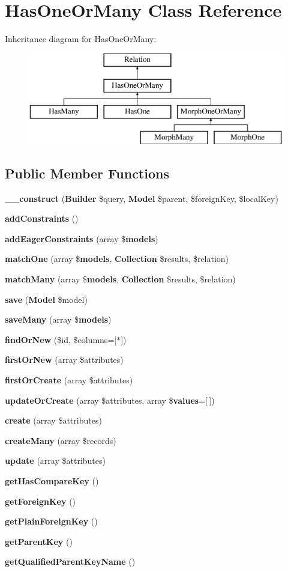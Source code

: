\section{Has\+One\+Or\+Many Class Reference}
\label{class_illuminate_1_1_database_1_1_eloquent_1_1_relations_1_1_has_one_or_many}
Inheritance diagram for Has\+One\+Or\+Many\+:\begin{figure}[H]
\begin{center}
\leavevmode
\includegraphics[height=4.000000cm]{class_illuminate_1_1_database_1_1_eloquent_1_1_relations_1_1_has_one_or_many}
\end{center}
\end{figure}
\subsection*{Public Member Functions}
\begin{DoxyCompactItemize}
\item 
{\bf \+\_\+\+\_\+construct} ({\bf Builder} \$query, {\bf Model} \$parent, \$foreign\+Key, \$local\+Key)
\item 
{\bf add\+Constraints} ()
\item 
{\bf add\+Eager\+Constraints} (array \${\bf models})
\item 
{\bf match\+One} (array \${\bf models}, {\bf Collection} \$results, \$relation)
\item 
{\bf match\+Many} (array \${\bf models}, {\bf Collection} \$results, \$relation)
\item 
{\bf save} ({\bf Model} \$model)
\item 
{\bf save\+Many} (array \${\bf models})
\item 
{\bf find\+Or\+New} (\$id, \$columns=[\textquotesingle{}$\ast$\textquotesingle{}])
\item 
{\bf first\+Or\+New} (array \$attributes)
\item 
{\bf first\+Or\+Create} (array \$attributes)
\item 
{\bf update\+Or\+Create} (array \$attributes, array \${\bf values}=[$\,$])
\item 
{\bf create} (array \$attributes)
\item 
{\bf create\+Many} (array \$records)
\item 
{\bf update} (array \$attributes)
\item 
{\bf get\+Has\+Compare\+Key} ()
\item 
{\bf get\+Foreign\+Key} ()
\item 
{\bf get\+Plain\+Foreign\+Key} ()
\item 
{\bf get\+Parent\+Key} ()
\item 
{\bf get\+Qualified\+Parent\+Key\+Name} ()
\end{DoxyCompactItemize}
